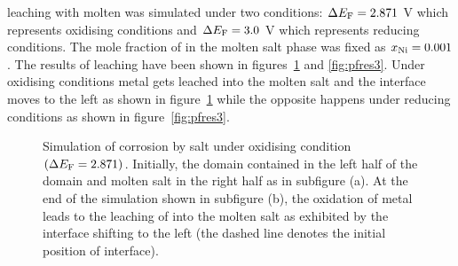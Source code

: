  leaching with molten  was simulated under two conditions: $\Delta E_{\ce{F}} = 2.871$ \si{\volt} which represents oxidising conditions and $\Delta E_{\ce{F}} = 3.0$ \si{\volt} which represents reducing conditions. The mole fraction of  in the molten salt phase was fixed as $x_{\ce{Ni}} = 0.001$. The results of  leaching have been shown in figures~\ref{fig:pfres2} and \ref{fig:pfres3}. Under oxidising conditions  metal gets leached into the molten salt and the interface moves to the left as shown in figure~\ref{fig:pfres2} while the opposite happens under reducing conditions as shown in  figure~\ref{fig:pfres3}. 
\begin{figure}[!ht]
    \hfill
    \caption[ corrosion by  salt under oxidising condition $\left(\Delta E_{\ce{F}} = 2.871\right)$.]{Simulation of  corrosion by  salt under oxidising condition $\left(\Delta E_{\ce{F}} = 2.871\right)$. Initially, the domain contained  in the left half of the domain and molten salt in the right half as in subfigure (a). At the end of the simulation shown in subfigure (b), the oxidation of  metal leads to the leaching of  into the molten salt as exhibited by the interface shifting to the left (the dashed line denotes the initial position of interface).}
    \label{fig:pfres2}
\end{figure}

